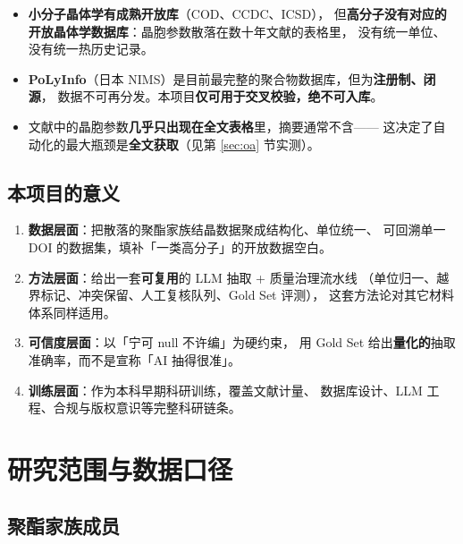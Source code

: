 \documentclass[11pt,a4paper]{ctexart}
\begin{document}
\begin{itemize}[leftmargin=1.2em]
  \item \textbf{小分子晶体学有成熟开放库}（COD、CCDC、ICSD），
        但\textbf{高分子没有对应的开放晶体学数据库}：晶胞参数散落在数十年文献的表格里，
        没有统一单位、没有统一热历史记录。
  \item \textbf{PoLyInfo}（日本 NIMS）是目前最完整的聚合物数据库，但为\textbf{注册制、闭源}，
        数据不可再分发。本项目\textbf{仅可用于交叉校验，绝不可入库}。
  \item 文献中的晶胞参数\textbf{几乎只出现在全文表格}里，摘要通常不含——
        这决定了自动化的最大瓶颈是\textbf{全文获取}（见第 \ref{sec:oa} 节实测）。
\end{itemize}

\subsection{本项目的意义}

\begin{enumerate}[leftmargin=1.6em]
  \item \textbf{数据层面}：把散落的聚酯家族结晶数据聚成结构化、单位统一、
        可回溯单一 DOI 的数据集，填补「一类高分子」的开放数据空白。
  \item \textbf{方法层面}：给出一套\textbf{可复用}的 LLM 抽取 + 质量治理流水线
        （单位归一、越界标记、冲突保留、人工复核队列、Gold Set 评测），
        这套方法论对其它材料体系同样适用。
  \item \textbf{可信度层面}：以「宁可 null 不许编」为硬约束，
        用 Gold Set 给出\textbf{量化的}抽取准确率，而不是宣称「AI 抽得很准」。
  \item \textbf{训练层面}：作为本科早期科研训练，覆盖文献计量、
        数据库设计、LLM 工程、合规与版权意识等完整科研链条。
\end{enumerate}

\section{研究范围与数据口径}

\subsection{聚酯家族成员}
\end{document}
